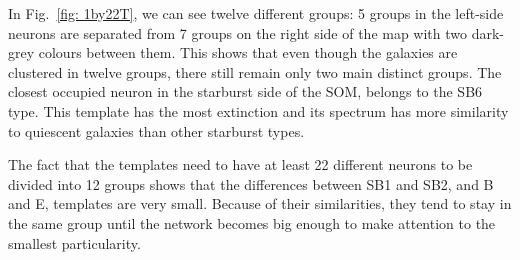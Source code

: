             In Fig.~\ref{fig: 1by22T}, we can see twelve different groups:
            5 groups in the left-side neurons are separated from 7 groups on the right side of the map with two dark-grey colours between them.
            This shows that even though the galaxies are clustered in twelve groups, there still remain only two main distinct groups.
            The closest occupied neuron in the starburst side of the SOM, belongs to the SB6 type. 
            This template has the most extinction and its spectrum has more similarity to quiescent galaxies than other starburst types. 
            
            The fact that the templates need to have at least 22 different neurons to be divided into 12 groups shows that the differences between SB1 and SB2, and B and E, templates are very small.
            Because of their similarities, they tend to stay in the same group until the network becomes big enough to make attention to the smallest particularity.
           

